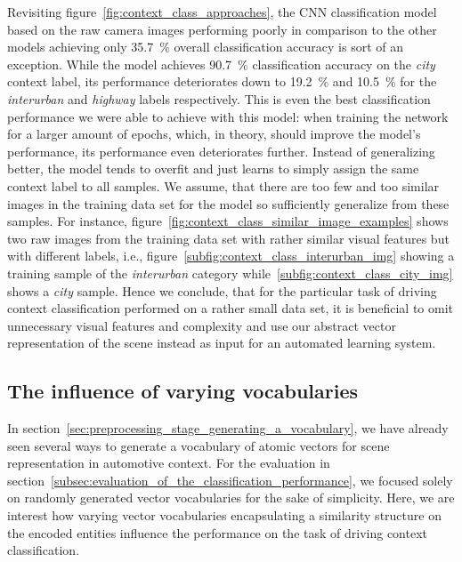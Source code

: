 Revisiting figure~\ref{fig:context_class_approaches}, the \ac{CNN} classification model based on the raw camera images performing poorly in comparison to the other models achieving only \SI{35.7}{\percent} overall classification accuracy is sort of an exception.
While the model achieves \SI{90.7}{\percent} classification accuracy on the \emph{city} context label, its performance deteriorates down to \SI{19.2}{\percent} and \SI{10.5}{\percent} for the \emph{interurban} and \emph{highway} labels respectively.
This is even the best classification performance we were able to achieve with this model: when training the network for a larger amount of epochs, which, in theory, should improve the model's performance, its performance even deteriorates further.
Instead of generalizing better, the model tends to overfit and just learns to simply assign the same context label to all samples.
We assume, that there are too few and too similar images in the training data set for the model so sufficiently generalize from these samples.
For instance, figure~\ref{fig:context_class_similar_image_examples} shows two raw images from the training data set with rather similar visual features but with different labels, i.e., figure~\ref{subfig:context_class_interurban_img} showing a training sample of the \emph{interurban} category while~\ref{subfig:context_class_city_img} shows a \emph{city} sample.
Hence we conclude, that for the particular task of driving context classification performed on a rather small data set, it is beneficial to omit unnecessary visual features and complexity and use our abstract vector representation of the scene instead as input for an automated learning system.

\subsection{The influence of varying vocabularies}%
\label{subsec:the_influence_of_varying_vocabularies}

In section~\ref{sec:preprocessing_stage_generating_a_vocabulary}, we have already seen several ways to generate a vocabulary of atomic vectors for scene representation in automotive context.
For the evaluation in section~\ref{subsec:evaluation_of_the_classification_performance}, we focused solely on randomly generated vector vocabularies for the sake of simplicity.
Here, we are interest how varying vector vocabularies encapsulating a similarity structure on the encoded entities influence the performance on the task of driving context classification.

